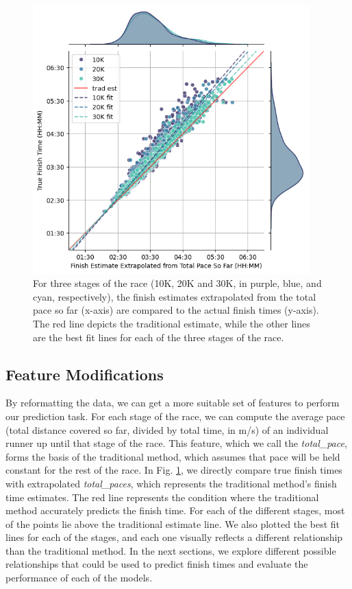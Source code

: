 \documentclass[USenglish,twocolumn]{article}
\theoremstyle{dgthm}
\theoremstyle{dgdef}
\begin{document}
\begin{figure}[ht]
    \centering
    \includegraphics[width=4.2in]{../analysis/plots/bos_data_scatter.png}
    \caption{For three stages of the race (10K, 20K and  30K, in purple, blue, and cyan, respectively), the finish estimates extrapolated from the total pace so far (x-axis) are compared to the actual finish times (y-axis). The red line depicts the traditional estimate, while the other lines are the best fit lines for each of the three stages of the race.}
    \label{fig:scatter}
\end{figure}

\subsection{Feature Modifications} 

By reformatting the data, we can get a more suitable set of features to perform our prediction task. For each stage of the race, we can compute the average pace (total distance covered so far, divided by total time, in m/s) of an individual runner up until that stage of the race. This feature, which we call the \emph{total\_pace}, forms the basis of the traditional method, which assumes that pace will be held constant for the rest of the race. In Fig. \ref{fig:scatter}, we directly compare true finish times with extrapolated \emph{total\_paces}, which represents the traditional method's finish time estimates. The red line represents the condition where the traditional method accurately predicts the finish time. For each of the different stages, most of the points lie above the traditional estimate line. We also plotted the best fit lines for each of the stages, and each one visually reflects a different relationship than the traditional method. In the next sections, we explore different possible relationships that could be used to predict finish times and evaluate the performance of each of the models.
\end{document}
